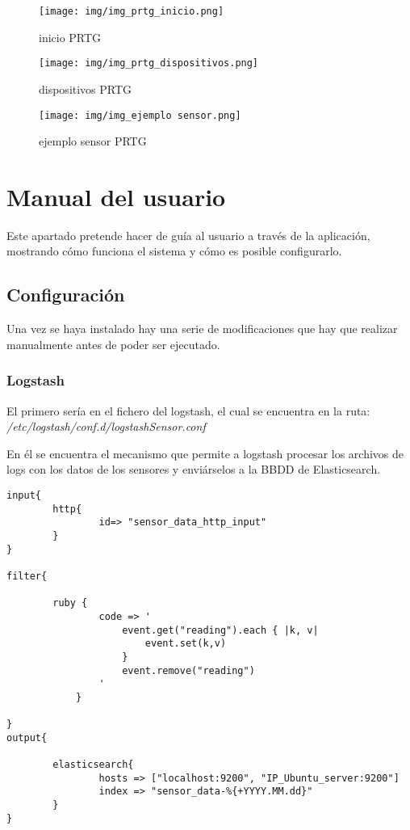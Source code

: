 \begin{figure}[h]
	\centering
	\texttt{[image: img/img\_prtg\_inicio.png]}
	\caption{inicio PRTG}
	\label{img_prtg_inicio}
\end{figure}

\begin{figure}[h]
	\centering
	\texttt{[image: img/img\_prtg\_dispositivos.png]}
	\caption{dispositivos PRTG}
	\label{img_prtg_dispositivos}
\end{figure}

\begin{figure}[h]
	\centering
	\texttt{[image: img/img\_ejemplo sensor.png]}
	\caption{ejemplo sensor PRTG}
	\label{img_ejemplo}
\end{figure}

\clearpage

\section{Manual del usuario}

Este apartado pretende hacer de guía al usuario a través de la aplicación, mostrando cómo funciona el sistema y cómo es posible configurarlo.

\subsection{Configuración}

 Una vez se haya instalado \nombrePrograma hay una serie de modificaciones que hay que realizar manualmente antes de poder ser ejecutado.
 
\subsubsection{Logstash}

 El primero sería en el fichero del logstash, el cual se encuentra en la ruta: \textit{/etc/logstash/conf.d/logstashSensor.conf}
 
 En él se encuentra el mecanismo que permite a logstash procesar los archivos de logs con los datos de los sensores y enviárselos a la BBDD de Elasticsearch.
 
 \begin{verbatim}
input{
        http{
                id=> "sensor_data_http_input"
        }
}

filter{

        ruby {
                code => '
                    event.get("reading").each { |k, v|
                        event.set(k,v)
                    }
                    event.remove("reading")
                '
            }

}
output{

        elasticsearch{
                hosts => ["localhost:9200", "IP_Ubuntu_server:9200"]
                index => "sensor_data-%{+YYYY.MM.dd}"
        }
}
 \end{verbatim}
 
